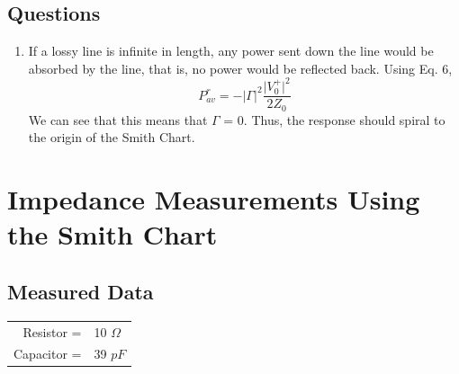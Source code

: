 \documentclass{article}
\begin{document}
\subsection{Questions}
\begin{enumerate}
	\item If a lossy line is infinite in length, any power sent down the line would be absorbed by the line, that is, no power would be reflected back. Using Eq. 6,
	\begin{equation}
		P_{av}^r = -\vert\Gamma\vert^2 \frac{\vert V_0^+\vert^2}{2Z_0}
	\end{equation}
We can see that this means that $\Gamma$ = 0. Thus, the response should spiral to the origin of the Smith Chart.
\end{enumerate}


\section{Impedance Measurements Using the Smith Chart}

\subsection{Measured Data}
\begin{table}[H]
\centering
	\begin{tabular}{rl}
	Resistor =   & 10 $\Omega$  \\
	Capacitor =  & 39 $pF$
	\end{tabular}
\end{table}
\end{document}
